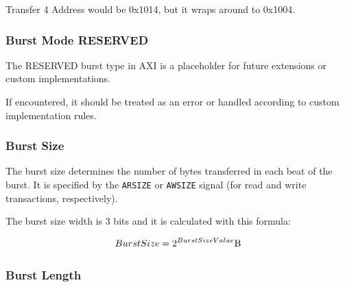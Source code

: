 Transfer 4 Address would be 0x1014, but it wraps around to 0x1004.

\subsubsection{Burst Mode RESERVED}
The RESERVED burst type in AXI is a placeholder for future extensions or custom implementations.

If encountered, it should be treated as an error or handled according to custom implementation rules.

\subsubsection{Burst Size}
The burst size determines the number of bytes transferred in each beat of the burst. It is specified by the \texttt{ARSIZE} or \texttt{AWSIZE} signal (for read and write transactions, respectively). 

The burst size width is 3 bits and it is calculated with this formula:

$$BurstSize = 2^{BurstSizeValue} \si{\byte}$$


\subsubsection{Burst Length}
